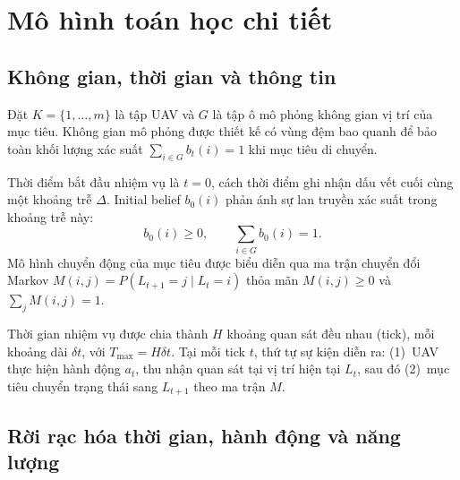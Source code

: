 \documentclass[12pt,a4paper]{article}
\begin{document}
\section{Mô hình toán học chi tiết}

\subsection{Không gian, thời gian và thông tin}

Đặt $K=\{1,\ldots,m\}$ là tập UAV và $G$ là tập ô mô phỏng không gian vị trí của mục tiêu. Không gian mô phỏng được thiết kế có vùng đệm bao quanh để bảo toàn khối lượng xác suất $\sum_{i\in G} b_t(i) = 1$ khi mục tiêu di chuyển.

Thời điểm bắt đầu nhiệm vụ là $t=0$, cách thời điểm ghi nhận dấu vết cuối cùng một khoảng trễ $\Delta$. Initial belief $b_0(i)$ phản ánh sự lan truyền xác suất trong khoảng trễ này:
\begin{equation}
b_0(i) \geq 0,\qquad \sum_{i\in G}b_0(i)=1.
\end{equation}
Mô hình chuyển động của mục tiêu được biểu diễn qua ma trận chuyển đổi Markov $M(i,j) = P(L_{t+1}=j \mid L_t=i)$ thỏa mãn $M(i,j)\geq0$ và $\sum_j M(i,j)=1$.

Thời gian nhiệm vụ được chia thành $H$ khoảng quan sát đều nhau (tick), mỗi khoảng dài $\delta t$, với $T_{\max} = H\delta t$. Tại mỗi tick $t$, thứ tự sự kiện diễn ra: (1)~UAV thực hiện hành động $a_t$, thu nhận quan sát tại vị trí hiện tại $L_t$, sau đó (2)~mục tiêu chuyển trạng thái sang $L_{t+1}$ theo ma trận $M$.

\subsection{Rời rạc hóa thời gian, hành động và năng lượng}
\end{document}
